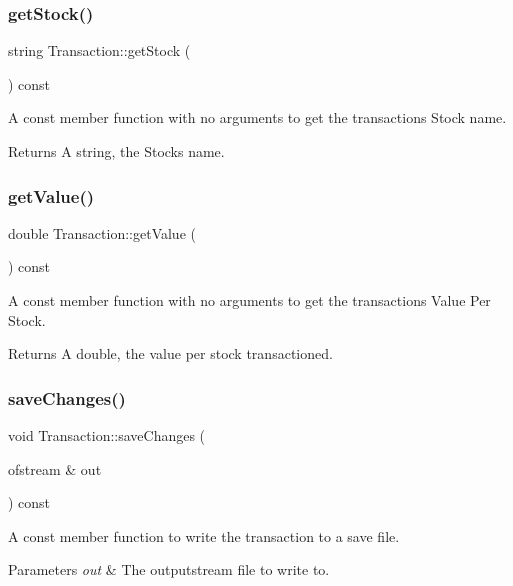 \subsubsection{\texorpdfstring{get\+Stock()}{getStock()}}
{\footnotesize\ttfamily string Transaction\+::get\+Stock (\begin{DoxyParamCaption}{ }\end{DoxyParamCaption}) const}

A const member function with no arguments to get the transaction\textquotesingle{}s Stock name. \begin{DoxyReturn}{Returns}
A string, the Stock\textquotesingle{}s name. 
\end{DoxyReturn}
\hypertarget{class_transaction_a95976b2e60b66d766edf4db534324db4}{}\label{class_transaction_a95976b2e60b66d766edf4db534324db4} 
\subsubsection{\texorpdfstring{get\+Value()}{getValue()}}
{\footnotesize\ttfamily double Transaction\+::get\+Value (\begin{DoxyParamCaption}{ }\end{DoxyParamCaption}) const}

A const member function with no arguments to get the transaction\textquotesingle{}s Value Per Stock. \begin{DoxyReturn}{Returns}
A double, the value per stock transactioned. 
\end{DoxyReturn}
\hypertarget{class_transaction_a3c0c3c4a64c5b3d20c420708357a86be}{}\label{class_transaction_a3c0c3c4a64c5b3d20c420708357a86be} 
\subsubsection{\texorpdfstring{save\+Changes()}{saveChanges()}}
{\footnotesize\ttfamily void Transaction\+::save\+Changes (\begin{DoxyParamCaption}\item[{ofstream \&}]{out }\end{DoxyParamCaption}) const}

A const member function to write the transaction to a save file. 
\begin{DoxyParams}{Parameters}
{\em out} & The outputstream file to write to. \\
\hline
\end{DoxyParams}


